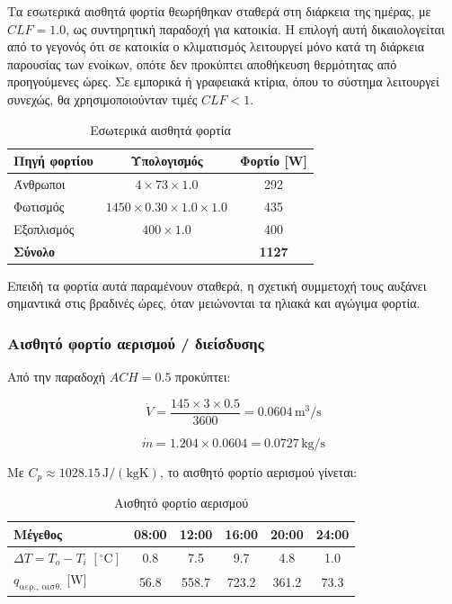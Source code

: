 \documentclass[12pt,a4paper]{article}
\begin{document}
Τα εσωτερικά αισθητά φορτία θεωρήθηκαν σταθερά στη διάρκεια της ημέρας, με
\(CLF=1.0\), ως συντηρητική παραδοχή για κατοικία. Η επιλογή αυτή δικαιολογείται
από το γεγονός ότι σε κατοικία ο κλιματισμός λειτουργεί μόνο κατά τη διάρκεια
παρουσίας των ενοίκων, οπότε δεν προκύπτει αποθήκευση θερμότητας από προηγούμενες
ώρες. Σε εμπορικά ή γραφειακά κτίρια, όπου το σύστημα λειτουργεί συνεχώς, θα
χρησιμοποιούνταν τιμές \(CLF < 1\).

\begin{table}[H]
\centering
\caption{Εσωτερικά αισθητά φορτία}
\begin{tabular}{lcc}
\toprule
\textbf{Πηγή φορτίου} & \textbf{Υπολογισμός} & \textbf{Φορτίο [W]} \\
\midrule
Άνθρωποι & \(4 \times 73 \times 1.0\) & 292 \\
Φωτισμός & \(1450 \times 0.30 \times 1.0 \times 1.0\) & 435 \\
Εξοπλισμός & \(400 \times 1.0\) & 400 \\
\midrule
\textbf{Σύνολο} &  & \textbf{1127} \\
\bottomrule
\end{tabular}
\end{table}

Επειδή τα φορτία αυτά παραμένουν σταθερά, η σχετική συμμετοχή τους αυξάνει σημαντικά
στις βραδινές ώρες, όταν μειώνονται τα ηλιακά και αγώγιμα φορτία.

\subsubsection{Αισθητό φορτίο αερισμού / διείσδυσης}

Από την παραδοχή \(ACH = 0.5\) προκύπτει:

\[
\dot V = \frac{145 \times 3 \times 0.5}{3600} = 0.0604\,\mathrm{m^3/s}
\]

\[
\dot m = 1.204 \times 0.0604 = 0.0727\,\mathrm{kg/s}
\]

Με \(C_p \approx 1028.15\,\mathrm{J/(kgK)}\), το αισθητό φορτίο αερισμού γίνεται:

\begin{table}[H]
\centering
\caption{Αισθητό φορτίο αερισμού}
\begin{tabular}{lccccc}
\toprule
\textbf{Μέγεθος} & \textbf{08:00} & \textbf{12:00} & \textbf{16:00} & \textbf{20:00} & \textbf{24:00} \\
\midrule
\(\Delta T = T_o - T_i\) \([\!^\circ\mathrm{C}]\) & 0.8 & 7.5 & 9.7 & 4.8 & 1.0 \\
\(q_{\text{αερ., αισθ.}}\) [W] & 56.8 & 558.7 & 723.2 & 361.2 & 73.3 \\
\bottomrule
\end{tabular}
\end{table}
\end{document}
